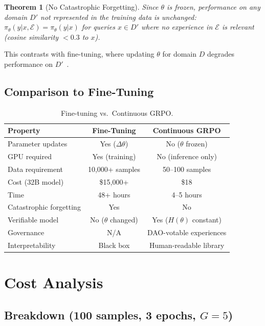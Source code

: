 \documentclass[11pt,letterpaper]{article}
\newtheorem{theorem}{Theorem}[section]
\begin{document}
\begin{theorem}[No Catastrophic Forgetting]
Since $\theta$ is frozen, performance on any domain $D'$ not represented in the training data is unchanged: $\pi_\theta(y | x, \mathcal{E}) = \pi_\theta(y | x)$ for queries $x \in D'$ where no experience in $\mathcal{E}$ is relevant (cosine similarity $< 0.3$ to $x$).
\end{theorem}

This contrasts with fine-tuning, where updating $\theta$ for domain $D$ degrades performance on $D'$~\cite{kirkpatrick2017overcoming}.

\subsection{Comparison to Fine-Tuning}

\begin{table}[t]
\centering
\begin{tabular}{lcc}
\toprule
\textbf{Property} & \textbf{Fine-Tuning} & \textbf{Continuous GRPO} \\
\midrule
Parameter updates & Yes ($\Delta\theta$) & No ($\theta$ frozen) \\
GPU required & Yes (training) & No (inference only) \\
Data requirement & 10{,}000+ samples & 50--100 samples \\
Cost (32B model) & \$15{,}000+ & \$18 \\
Time & 48+ hours & 4--5 hours \\
Catastrophic forgetting & Yes & No \\
Verifiable model & No ($\theta$ changed) & Yes ($H(\theta)$ constant) \\
Governance & N/A & DAO-votable experiences \\
Interpretability & Black box & Human-readable library \\
\bottomrule
\end{tabular}
\caption{Fine-tuning vs.\ Continuous GRPO.}
\label{tab:comparison}
\end{table}

\section{Cost Analysis}
\label{sec:cost}

\subsection{Breakdown (100 samples, 3 epochs, $G=5$)}
\end{document}
